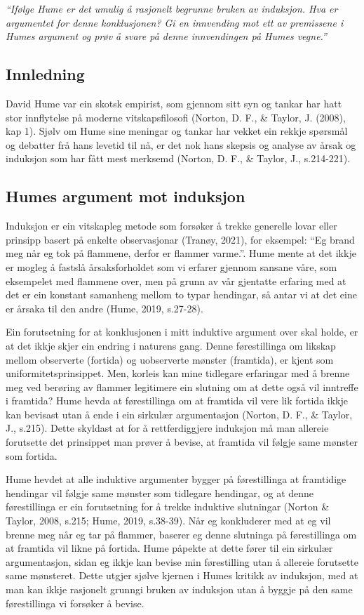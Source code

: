 \documentclass[
  letterpaper,
  DIV=11,
  numbers=noendperiod]{scrreprt}
\begin{document}
\emph{``Ifølge Hume er det umulig å rasjonelt begrunne bruken av
induksjon. Hva er argumentet for denne konklusjonen? Gi en innvending
mot ett av premissene i Humes argument og prøv å svare på denne
innvendingen på Humes vegne.''}

\subsection{Innledning}\label{innledning-1}

David Hume var ein skotsk empirist, som gjennom sitt syn og tankar har
hatt stor innflytelse på moderne vitskapsfilosofi (Norton, D. F., \&
Taylor, J. (2008), kap 1). Sjølv om Hume sine meningar og tankar har
vekket ein rekkje spørsmål og debatter frå hans levetid til nå, er det
nok hans skepsis og analyse av årsak og induksjon som har fått mest
merksemd (Norton, D. F., \& Taylor, J., s.214-221).

\subsection{Humes argument mot
induksjon}\label{humes-argument-mot-induksjon}

Induksjon er ein vitskapleg metode som forsøker å trekke generelle lovar
eller prinsipp basert på enkelte observasjonar (Tranøy, 2021), for
eksempel: ``Eg brand meg når eg tok på flammene, derfor er flammer
varme.''. Hume mente at det ikkje er mogleg å fastslå årsaksforholdet
som vi erfarer gjennom sansane våre, som eksempelet med flammene over,
men på grunn av vår gjentatte erfaring med at det er ein konstant
samanheng mellom to typar hendingar, så antar vi at det eine er årsaka
til den andre (Hume, 2019, s.27-28).

Ein forutsetning for at konklusjonen i mitt induktive argument over skal
holde, er at det ikkje skjer ein endring i naturens gang. Denne
førestillinga om likskap mellom observerte (fortida) og uobserverte
mønster (framtida), er kjent som uniformitetsprinsippet. Men, korleis
kan mine tidlegare erfaringar med å brenne meg ved berøring av flammer
legitimere ein slutning om at dette også vil inntreffe i framtida? Hume
hevda at førestillinga om at framtida vil vere lik fortida ikkje kan
bevisast utan å ende i ein sirkulær argumentasjon (Norton, D. F., \&
Taylor, J., s.215). Dette skyldast at for å rettferdiggjere induksjon må
man allereie forutsette det prinsippet man prøver å bevise, at framtida
vil følgje same mønster som fortida.

Hume hevdet at alle induktive argumenter bygger på førestillinga at
framtidige hendingar vil følgje same mønster som tidlegare hendingar, og
at denne førestillinga er ein forutsetning for å trekke induktive
slutningar (Norton \& Taylor, 2008, s.215; Hume, 2019, s.38-39). Når eg
konkluderer med at eg vil brenne meg når eg tar på flammer, baserer eg
denne slutninga på førestillinga om at framtida vil likne på fortida.
Hume påpekte at dette fører til ein sirkulær argumentasjon, sidan eg
ikkje kan bevise min førestilling utan å allereie forutsette same
mønsteret. Dette utgjer sjølve kjernen i Humes kritikk av induksjon, med
at man kan ikkje rasjonelt grunngi bruken av induksjon utan å byggje på
den same førestillinga vi forsøker å bevise.
\end{document}
